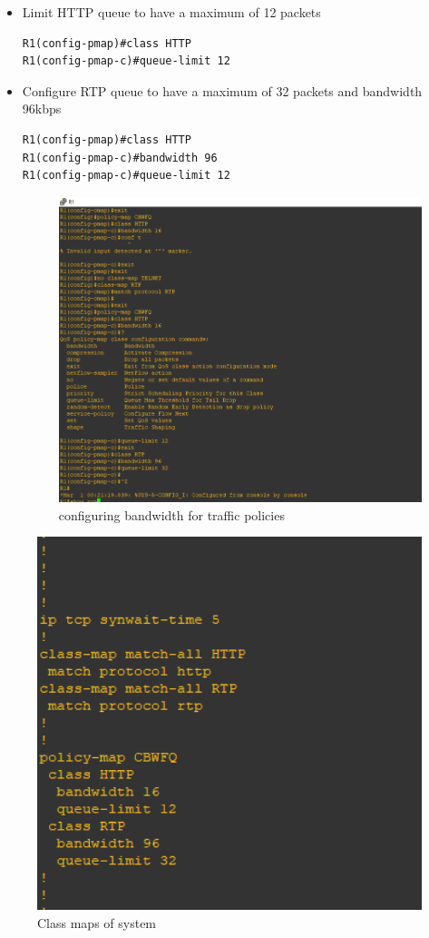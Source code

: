 \documentclass[paper=letter, fontsize=12pt]{article}
\begin{document}
\begin{itemize}
	\item Limit HTTP queue to have a maximum of 12 packets
\begin{verbatim}
R1(config-pmap)#class HTTP
R1(config-pmap-c)#queue-limit 12
\end{verbatim}

	\item Configure RTP queue to have a maximum of 32 packets and bandwidth 96kbps
\begin{verbatim}
R1(config-pmap)#class HTTP
R1(config-pmap-c)#bandwidth 96
R1(config-pmap-c)#queue-limit 12
\end{verbatim}
	\begin{figure}[H]
		\setlength{\parindent}{-5em} 
		\includegraphics[width=550px]{refs/rtp}
		\caption{configuring bandwidth for traffic policies}
	\end{figure}
\end{itemize}

\begin{figure}[H]
	\includegraphics[width=450px]{refs/classmaps}
	\caption{Class maps of system}
\end{figure}
\end{document}
